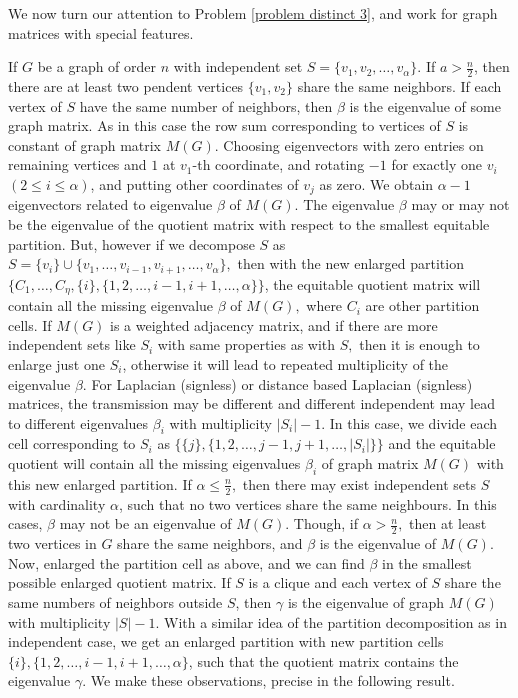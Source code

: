 \documentclass[12pt,twoside]{article}
\begin{document}
\vskip 2mm
We now turn our attention to Problem \ref{problem distinct 3}, and work for graph matrices with special features.

If $G$ be a graph of order $n$ with independent set $S=\{v_{1},v_{2},\dots,v_{\alpha}\}. $ If $a> \frac{n}{2}$, then there are at least two pendent vertices $\{v_{1},v_{2}\}$ share the same neighbors. If each vertex of $S$ have the same number of neighbors, then $ \beta$ is the eigenvalue of some graph matrix. As in this case the row sum corresponding to vertices of $S$ is constant of  graph matrix $M(G).$ Choosing eigenvectors with zero entries on remaining vertices and $1$ at $v_{1}$-th coordinate, and rotating $-1$ for exactly one $v_{i}$ $(2\leq i\leq \alpha)$, and putting other coordinates of $v_{j}$ as zero. We obtain $\alpha-1$ eigenvectors related to eigenvalue $\beta$ of $M(G).$ The eigenvalue $\beta$ may or may not be the eigenvalue of the quotient matrix with respect to the smallest equitable partition. But, however if we decompose $S$ as $S=\{v_{i}\}\cup \{v_{1},\dots,v_{i-1},v_{i+1},\dots,v_{\alpha}\},$ then with the new enlarged partition $\{C_{1},\dots,C_{\eta}, \{i\},\{1,2,\dots,i-1,i+1,\dots,\alpha\}\}$, the equitable quotient matrix will contain all the missing eigenvalue $\beta$ of $M(G),$
where  $C_{i}$ are other partition cells. If $M(G)$ is a weighted adjacency matrix, and if there are more independent sets like $S_{i}$ with same properties as with $S,$ then it is enough to enlarge just one $S_{i}$, otherwise it will lead to repeated multiplicity of the eigenvalue $\beta.$ For Laplacian (signless) or distance based Laplacian (signless) matrices, the transmission may be different and different independent may lead to different eigenvalues $\beta_{i}$ with multiplicity $|S_{i}|-1$. In this case, we divide each cell corresponding to $S_{i}$ as $\{\{j\},\{1,2,\dots,j-1,j+1,\dots,|S_{i}|\}\}$ and the equitable quotient will contain all the missing eigenvalues $\beta_{i}$ of graph matrix $M(G)$ with this new enlarged partition. If $\alpha\leq \frac{n}{2},$ then there may exist independent sets  $S$ with cardinality $\alpha$, such that no two vertices share the same neighbours. In this cases, $\beta$ may not be an eigenvalue of $M(G)$. Though, if $\alpha>\frac{n}{2},$ then at least two vertices in $G$ share the same neighbors, and $\beta$ is the eigenvalue of $M(G).$ Now, enlarged the partition cell as above, and we can find $\beta$ in the smallest possible enlarged quotient matrix.  If $S$ is a clique and each vertex of $S$ share the same numbers of neighbors outside $S$, then $\gamma$ is the eigenvalue of graph $M(G)$ with multiplicity $|S|-1$. With a similar idea of the partition decomposition as in independent case, we get an enlarged partition with new partition cells $ \{i\},\{1,2,\dots,i-1,i+1,\dots,\alpha\}$, such that the quotient matrix contains the eigenvalue $\gamma.$ We make these observations, precise in the following result.
\end{document}
